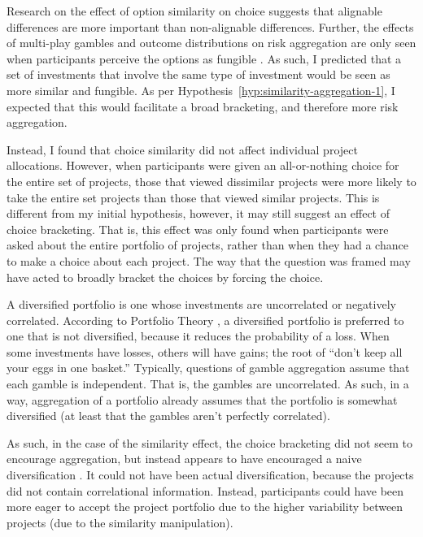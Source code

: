 \documentclass[a4paper, nobind, dvipsnames]{templates/ociamthesis}
\theoremstyle{definition}
\theoremstyle{definition}
\theoremstyle{definition}
\theoremstyle{definition}
\theoremstyle{remark}
\begin{document}
Research on the effect of option similarity on choice \autocite[e.g.,][]{markman1995}
suggests that alignable differences are more important than non-alignable
differences. Further, the effects of multi-play gambles and outcome
distributions on risk aggregation are only seen when participants perceive the
options as fungible \autocite[e.g.,][]{dekay2005}. As such, I predicted that a set of
investments that involve the same type of investment would be seen as more
similar and fungible. As per Hypothesis~\ref{hyp:similarity-aggregation-1}, I
expected that this would facilitate a broad bracketing, and therefore more risk
aggregation.

Instead, I found that choice similarity did not affect individual project
allocations. However, when participants were given an all-or-nothing choice for
the entire set of projects, those that viewed dissimilar projects were more
likely to take the entire set projects than those that viewed similar projects.
This is different from my initial hypothesis, however, it may still suggest an
effect of choice bracketing. That is, this effect was only found when
participants were asked about the entire portfolio of projects, rather than when
they had a chance to make a choice about each project. The way that the question
was framed may have acted to broadly bracket the choices by forcing the choice.

A diversified portfolio is one whose investments are uncorrelated or negatively
correlated. According to Portfolio Theory \autocite{markowitz1952}, a diversified
portfolio is preferred to one that is not diversified, because it reduces the
probability of a loss. When some investments have losses, others will have
gains; the root of ``don't keep all your eggs in one basket.'' Typically,
questions of gamble aggregation assume that each gamble is independent. That is,
the gambles are uncorrelated. As such, in a way, aggregation of a portfolio
already assumes that the portfolio is somewhat diversified (at least that the
gambles aren't perfectly correlated).

As such, in the case of the similarity effect, the choice bracketing did not
seem to encourage aggregation, but instead appears to have encouraged a naive
diversification \autocite{hedesstrom2006,read1995}. It could not have been actual
diversification, because the projects did not contain correlational information.
Instead, participants could have been more eager to accept the project portfolio
due to the higher variability between projects (due to the similarity
manipulation).
\end{document}
